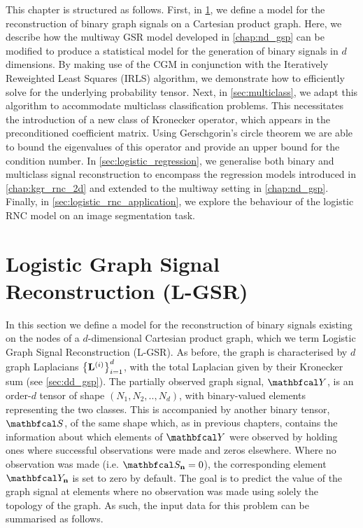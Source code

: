 This chapter is structured as follows. First, in \cref{sec:lgsr}, we define a model for the reconstruction of binary graph signals on a Cartesian product graph. Here, we describe how the multiway GSR model developed in \cref{chap:nd_gsp} can be modified to produce a statistical model for the generation of binary signals in $d$ dimensions. By making use of the CGM in conjunction with the Iteratively Reweighted Least Squares (IRLS) algorithm, we demonstrate how to efficiently solve for the underlying probability tensor. Next, in \cref{sec:multiclass}, we adapt this algorithm to accommodate multiclass classification problems. This necessitates the introduction of a new class of Kronecker operator, which appears in the preconditioned coefficient matrix. Using Gerschgorin's circle theorem we are able to bound the eigenvalues of this operator and provide an upper bound for the condition number. In \cref{sec:logistic_regression}, we generalise both binary and multiclass signal reconstruction to encompass the regression models introduced in \cref{chap:kgr_rnc_2d} and extended to the multiway setting in \cref{chap:nd_gsp}. Finally, in \cref{sec:logistic_rnc_application}, we explore the behaviour of the logistic RNC model on an image segmentation task. 


\section{Logistic Graph Signal Reconstruction (L-GSR)}

\label{sec:lgsr}

In this section we define a model for the reconstruction of binary signals existing on the nodes of a $d$-dimensional Cartesian product graph, which we term Logistic Graph Signal Reconstruction (L-GSR). As before, the graph is characterised by $d$ graph Laplacians $\left\{\mathbf{L}^{(i)}\right\}_{i=1}^d$, with the total Laplacian given by their Kronecker sum (see \cref{sec:dd_gsp}). The partially observed graph signal, $\Yt$, is an order-$d$ tensor of shape $(N_1, N_2, .., N_d)$, with binary-valued elements representing the two classes. This is accompanied by another binary tensor, $\St$, of the same shape which, as in previous chapters, contains the information about which elements of $\Yt$ were observed by holding ones where successful observations were made and zeros elsewhere. Where no observation was made (i.e. $\St_{\nn} = 0$), the corresponding element $\Yt_{\nn}$ is set to zero by default. The goal is to predict the value of the graph signal at elements where no observation was made using solely the topology of the graph. As such, the input data for this problem can be summarised as follows. 

